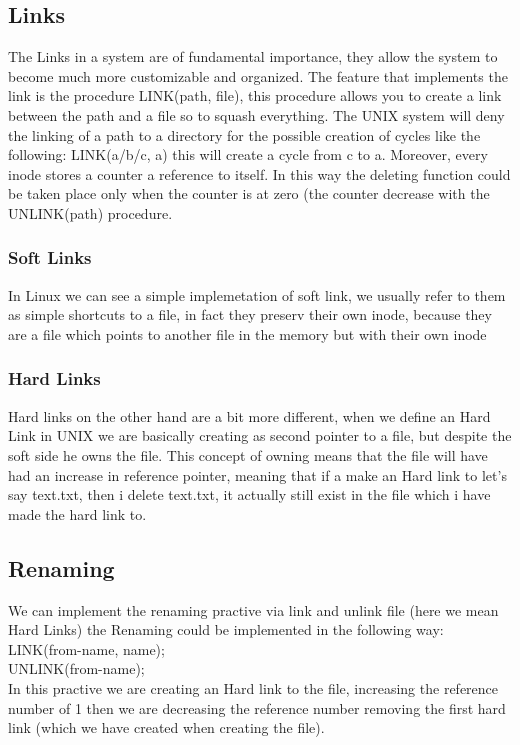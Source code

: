 \documentclass{article}
\begin{document}
    \subsection{Links}
      The Links in a system are of fundamental importance, they allow the system to become
      much more customizable and organized. The feature that implements the link is the 
      procedure LINK(path, file), this procedure allows you to create a link between the 
      path and a file so to squash everything. The UNIX system will deny the linking of a 
      path to a directory for the possible creation of cycles like the following: LINK(a/b/c, a)
      this will create a cycle from c to a. Moreover, every inode stores a counter a reference
      to itself. In this way the deleting function could be taken place only when the counter is 
      at zero (the counter decrease with the UNLINK(path) procedure.
      \subsubsection{Soft Links}
        In Linux we can see a simple implemetation of soft link, we usually refer to them 
        as simple shortcuts to a file, in fact they preserv their own inode, because they are
        a file which points to another file in the memory but with their own inode 
      \subsubsection{Hard Links}
        Hard links on the other hand are a bit more different, when we define an Hard Link
        in UNIX we are basically creating as second pointer to a file, but despite the 
        soft side he owns the file. This concept of owning means that the file will have 
        had an increase in reference pointer, meaning that if a make an Hard link to let's
        say text.txt, then i delete text.txt, it actually still exist in the file which 
        i have made the hard link to. 
    \subsection{Renaming}
      We can implement the renaming practive via link and unlink file (here we mean Hard Links)
      the Renaming could be implemented in the following way:
      LINK(from-name, name); \\
      UNLINK(from-name); \\
      In this practive we are creating an Hard link to the file, increasing the reference
      number of 1 then we are decreasing the reference number removing the first hard link
      (which we have created when creating the file).
\end{document}

